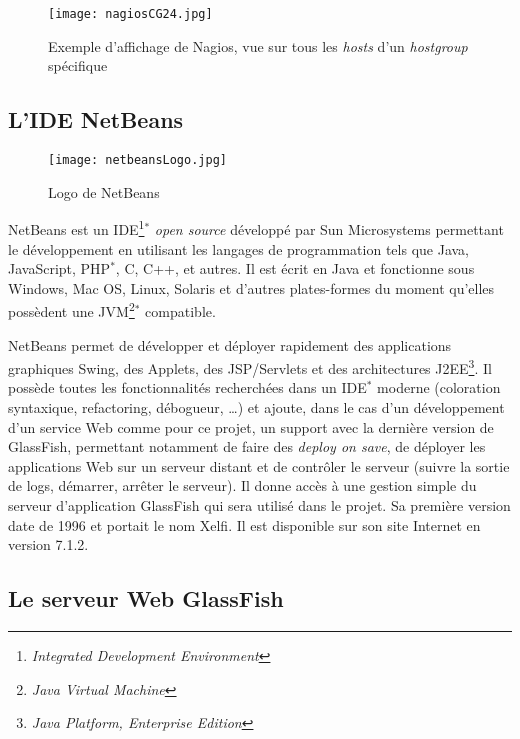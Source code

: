 \begin{figure}[!ht]
	\centering
	\texttt{[image: nagiosCG24.jpg]}
	\caption{Exemple d'affichage de Nagios, vue sur tous les \textit{hosts} d'un \textit{hostgroup} sp\'ecifique}
	\label{figure:nagiosCG24}
	
\end{figure}

\subsection{L'IDE NetBeans}
\label{section:netbeans}

\begin{figure}[!ht]
	\centering
	\texttt{[image: netbeansLogo.jpg]}
	\caption{Logo de NetBeans}

\end{figure}

NetBeans est un IDE\protect\footnote{\textit{Integrated Development Environment}}$^*$ \textit{open source} d\'evelopp\'e par Sun Microsystems permettant le d\'eveloppement en utilisant les langages de programmation tels que Java, JavaScript, PHP$^*$, C, C++, et autres.
Il est \'ecrit en Java et fonctionne sous Windows, Mac OS, Linux, Solaris et d'autres plates-formes du moment qu'elles poss\`edent une JVM\protect\footnote{\textit{Java Virtual Machine}}$^*$ compatible.

NetBeans permet de d\'evelopper et d\'eployer rapidement des applications graphiques Swing, des Applets, des JSP/Servlets et des architectures J2EE\protect\footnote{\textit{Java Platform, Enterprise Edition}}.
Il poss\`ede toutes les fonctionnalit\'es recherch\'ees dans un IDE$^*$ moderne (coloration syntaxique, refactoring, d\'ebogueur, \ldots) et ajoute, dans le cas d'un d\'eveloppement d'un service Web comme pour ce projet, un support avec la derni\`ere version de GlassFish, permettant notamment de faire des {\og}\textit{deploy on save}{\fg}, de d\'eployer les applications Web sur un serveur distant et de contr\^oler le serveur (suivre la sortie de logs, d\'emarrer, arr\^eter le serveur). 
Il donne acc\`es \`a une gestion simple du serveur d'application GlassFish qui sera utilis\'e dans le projet.
Sa premi\`ere version date de 1996 et portait le nom Xelfi. 
Il est disponible sur son site Internet\cite{biblio:siteNetbeans} en version 7.1.2.

\subsection{Le serveur Web GlassFish}
\label{section:glassfish}

